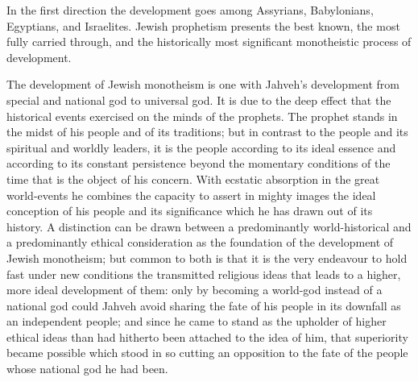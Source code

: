 \documentclass[12pt,a4paper]{book}
\begin{document}
In the first direction the development goes among Assyrians, Babylonians, Egyptians, and
Israelites. Jewish prophetism presents the best known, the most fully carried through, and
the historically most significant monotheistic process of development.

The development of Jewish monotheism is one with Jahveh's development from special and
national god to universal god. It is due to the deep effect that the historical events
exercised on the minds of the prophets. The prophet stands in the midst of his people and
of its traditions; but in contrast to the people and its spiritual and worldly leaders, it
is the people according to its ideal essence and according to its constant persistence
beyond the momentary conditions of the time that is the object of his concern. With
ecstatic absorption in the great world-events he combines the capacity to assert in mighty
images the ideal conception of his people and its significance which he has drawn out of
its history. A distinction can be drawn between a predominantly world-historical and a
predominantly ethical consideration as the foundation of the development of Jewish
monotheism; but common to both is that it is the very endeavour to hold fast under new
conditions the transmitted religious ideas that leads to a higher, more ideal development
of them: only by becoming a world-god instead of a national god could Jahveh avoid sharing
the fate of his people in its downfall as an independent people; and since he came to stand
as the upholder of higher ethical ideas than had hitherto been attached to the idea of him,
that superiority became possible which stood in so cutting an opposition to the fate of the
people whose national god he had been.
\end{document}
